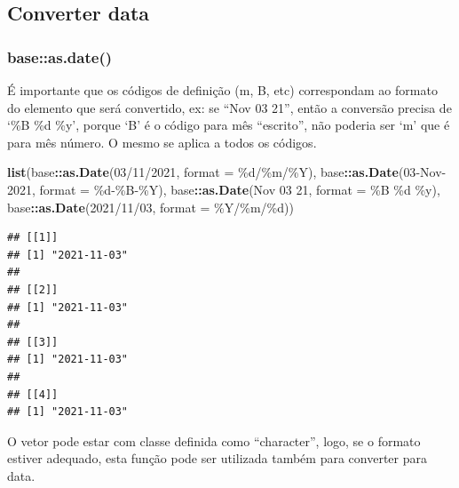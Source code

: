 \documentclass[
]{book}
\newenvironment{Shaded}{\begin{snugshade}}{\end{snugshade}}
\newcommand{\AttributeTok}[1]{\textcolor[rgb]{0.13,0.29,0.53}{#1}}
\newcommand{\FunctionTok}[1]{\textcolor[rgb]{0.13,0.29,0.53}{\textbf{#1}}}
\newcommand{\NormalTok}[1]{#1}
\newcommand{\SpecialCharTok}[1]{\textcolor[rgb]{0.81,0.36,0.00}{\textbf{#1}}}
\newcommand{\StringTok}[1]{\textcolor[rgb]{0.31,0.60,0.02}{#1}}
\theoremstyle{definition}
\theoremstyle{definition}
\theoremstyle{definition}
\theoremstyle{definition}
\theoremstyle{remark}
\begin{document}
\hypertarget{converter-data}{%
\subsection{Converter data}\label{converter-data}}

\hypertarget{baseas.date}{%
\subsubsection{base::as.date()}\label{baseas.date}}

É importante que os códigos de definição (m, B, etc) correspondam ao formato do elemento que será convertido, ex: se ``Nov 03 21'', então a conversão precisa de `\%B \%d \%y', porque `B' é o código para mês ``escrito'', não poderia ser `m' que é para mês número. O mesmo se aplica a todos os códigos.

\begin{Shaded}
\begin{Highlighting}[]
\FunctionTok{list}\NormalTok{(base}\SpecialCharTok{::}\FunctionTok{as.Date}\NormalTok{(}\StringTok{\textquotesingle{}03/11/2021\textquotesingle{}}\NormalTok{,  }\AttributeTok{format =} \StringTok{\textquotesingle{}\%d/\%m/\%Y\textquotesingle{}}\NormalTok{),}
\NormalTok{     base}\SpecialCharTok{::}\FunctionTok{as.Date}\NormalTok{(}\StringTok{\textquotesingle{}03{-}Nov{-}2021\textquotesingle{}}\NormalTok{, }\AttributeTok{format =} \StringTok{\textquotesingle{}\%d{-}\%B{-}\%Y\textquotesingle{}}\NormalTok{),}
\NormalTok{     base}\SpecialCharTok{::}\FunctionTok{as.Date}\NormalTok{(}\StringTok{\textquotesingle{}Nov 03 21\textquotesingle{}}\NormalTok{,   }\AttributeTok{format =} \StringTok{\textquotesingle{}\%B \%d \%y\textquotesingle{}}\NormalTok{),}
\NormalTok{     base}\SpecialCharTok{::}\FunctionTok{as.Date}\NormalTok{(}\StringTok{\textquotesingle{}2021/11/03\textquotesingle{}}\NormalTok{,  }\AttributeTok{format =} \StringTok{\textquotesingle{}\%Y/\%m/\%d\textquotesingle{}}\NormalTok{))}
\end{Highlighting}
\end{Shaded}

\begin{verbatim}
## [[1]]
## [1] "2021-11-03"
## 
## [[2]]
## [1] "2021-11-03"
## 
## [[3]]
## [1] "2021-11-03"
## 
## [[4]]
## [1] "2021-11-03"
\end{verbatim}

O vetor pode estar com classe definida como ``character'', logo, se o formato estiver adequado, esta função pode ser utilizada também para converter para data.
\end{document}
